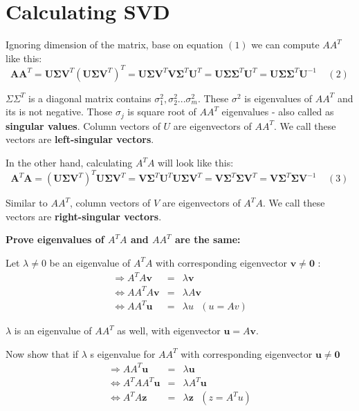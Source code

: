 \documentclass[a4paper, 12pt]{report}
\begin{document}
\section{Calculating SVD}
\indent \par Ignoring dimension of the matrix, base on equation $(1)$ we can compute $AA^T$ like this:
\begin{equation*}
\mathbf{AA}^T = \mathbf{U}\mathbf{\Sigma} \mathbf{V}^T (\mathbf{U}\mathbf{\Sigma} \mathbf{V}^T)^T  
= \mathbf{U}\mathbf{\Sigma} \mathbf{V}^T \mathbf{V}\mathbf{\Sigma}^T\mathbf{U}^T
= \mathbf{U}\mathbf{\Sigma}\mathbf{\Sigma}^T\mathbf{U}^T = \mathbf{U}\mathbf{\Sigma}\mathbf{\Sigma}^T\mathbf{U}^{-1}  ~~~~~ (2)
\end{equation*}
\indent \par $\Sigma \Sigma^T$ is a diagonal matrix contains $\sigma^2_{1},\sigma^2_{2}...\sigma^2_{m}$. These $\sigma^2$ is eigenvalues of $AA^T$ and its is not negative. Those $\sigma_j$ is square root of $AA^T$ eigenvalues - also called as \textbf{singular values}. Column vectors of $U$ are eigenvectors of $AA^T$. We call these vectors are \textbf{left-singular vectors}.\\
\indent \par In the other hand, calculating $A^TA$ will look like this:
\begin{equation*}
\mathbf{A}^T\mathbf{A} = (\mathbf{U}\mathbf{\Sigma} \mathbf{V}^T)^T \mathbf{U}\mathbf{\Sigma} \mathbf{V}^T 
= \mathbf{V}\mathbf{\Sigma}^T\mathbf{U}^T   \mathbf{U}\mathbf{\Sigma} \mathbf{V}^T 
= \mathbf{V}\mathbf{\Sigma}^T\mathbf{\Sigma}\mathbf{V}^T =  \mathbf{V}\mathbf{\Sigma}^T\mathbf{\Sigma}\mathbf{V}^{-1} ~~~~~ (3)
\end{equation*}

Similar to $AA^T$, column vectors of $V$ are eigenvectors of $A^TA$. We call these vectors are \textbf{right-singular vectors}.

\par\textbf{Prove eigenvalues of $A^T A$ and $A A^T$ are the same:}
\par Let $\lambda \ne 0$ be an eigenvalue of $A^T A$ with corresponding eigenvector $ \mathbf v \ne \mathbf 0$ :
\begin{eqnarray*}
 \Rightarrow A^T A \mathbf v &=& \lambda \mathbf v\\
 \Leftrightarrow AA^T A \mathbf v &=& \lambda A \mathbf v \\
 \Leftrightarrow AA^T \mathbf u &=& \lambda u ~~~(u=Av)
\end{eqnarray*}
\par $\lambda$ is an eigenvalue of $A A^T$ as well, with eigenvector $\mathbf u = A \mathbf v$.
\par Now show that if $\lambda$ s eigenvalue for $AA^T$ with corresponding eigenvector $\mathbf u \ne \mathbf 0$
\begin{eqnarray*}
 \Rightarrow AA^T\mathbf u &=& \lambda \mathbf u\\
 \Leftrightarrow A^TAA^T \mathbf u &=& \lambda A^T \mathbf u \\
 \Leftrightarrow A^TA \mathbf z  &=& \lambda \mathbf z ~~~(z=A^Tu)
\end{eqnarray*}
\end{document}

